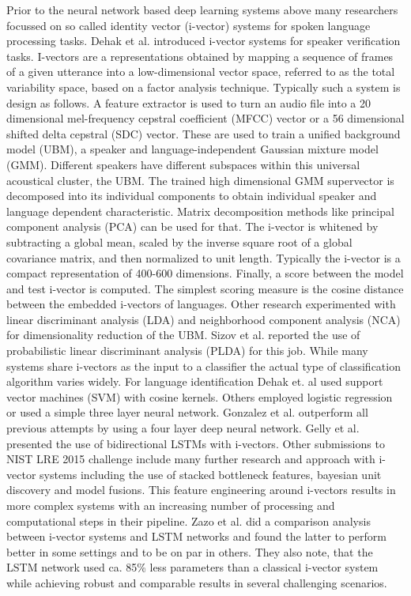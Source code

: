 Prior to the neural network based deep learning systems above many researchers focussed on so called identity vector (i-vector) systems for spoken language processing tasks. Dehak et al.\cite{dehak2011front} introduced i-vector systems for speaker verification tasks. I-vectors are a representations obtained by mapping a sequence of frames of a given utterance into a low-dimensional vector space, referred to as the total 	variability space, based on a factor analysis technique. Typically such a system is design as follows. A feature extractor is used to turn an audio file into a 20 dimensional mel-frequency cepstral coefficient (MFCC) vector or a 56 dimensional shifted delta cepstral (SDC) vector. These are used to train a unified background model (UBM), a speaker and language-independent Gaussian mixture model (GMM). Different speakers have different subspaces within this universal acoustical cluster, the UBM. The trained high dimensional GMM supervector is decomposed into its individual components to obtain individual speaker and language dependent characteristic. Matrix decomposition methods like principal component analysis (PCA) can be used for that. The i-vector is whitened by subtracting a global mean, scaled by the inverse square root of a global covariance matrix, and then normalized to unit length\cite{garcia2011analysis}. Typically the i-vector is a compact representation of 400-600 dimensions. Finally, a score between the model and test i-vector is computed. The simplest scoring measure is the cosine distance between the embedded i-vectors of languages. 
Other research\cite{dehak2011front} experimented with linear discriminant analysis (LDA) and neighborhood component analysis (NCA) for dimensionality reduction of the UBM. Sizov et al. reported the use of probabilistic linear discriminant analysis (PLDA) for this job.\cite{sizov2016discriminating}
While many systems share i-vectors as the input to a classifier the actual type of classification algorithm varies widely. For language identification Dehak et. al\cite{dehak2011front} used support vector machines (SVM) with cosine kernels. Others\cite{martinez2011language} employed logistic regression or used a simple three layer neural network\cite{plchot2016bat}. Gonzalez et al.\cite{gonzalez2015frame} outperform all previous attempts by using a four layer deep neural network. Gelly et al.\cite{gelly2016language} presented the use of bidirectional LSTMs with i-vectors. Other submissions\cite{lee20162015, torres2008mitll, ng2016sheffield} to NIST LRE 2015 challenge\cite{lre2015} include many further research and approach with i-vector systems including the use of stacked bottleneck features, bayesian unit discovery and model fusions. This feature engineering around i-vectors results in more complex systems with an increasing number of processing and computational steps in their pipeline. Zazo et al.\cite{zazo2016evaluation} did a comparison analysis between i-vector systems and LSTM networks and found the latter to perform better in some settings and to be on par in others. They also note, that the LSTM network used ca. 85\% less parameters than a classical i-vector system while achieving robust and comparable results in several challenging scenarios.





       